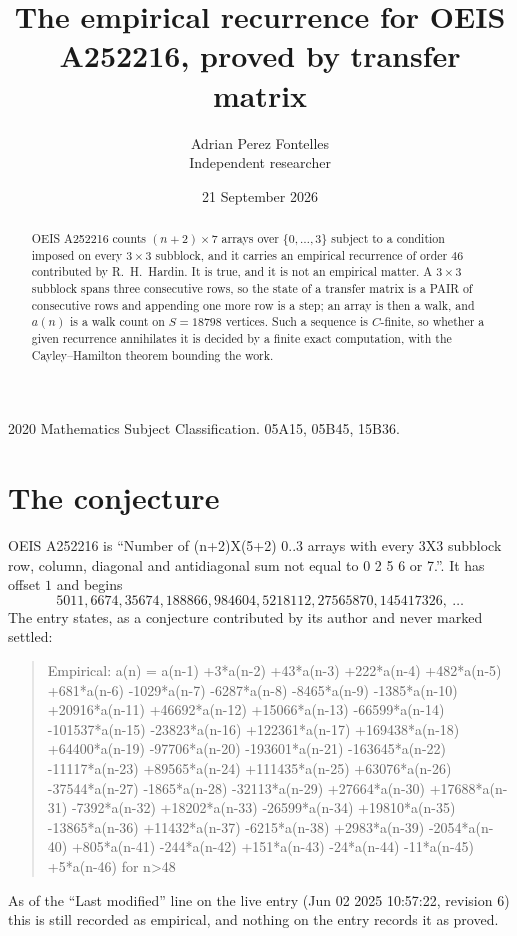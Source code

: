 \documentclass[11pt,a4paper]{article}
\title{The empirical recurrence for OEIS A252216, proved by transfer matrix}
\author{Adrian Perez Fontelles\\ \small Independent researcher}
\date{21 September 2026}
\theoremstyle{plain}
\theoremstyle{definition}
\begin{document}
\maketitle

\begin{abstract}
OEIS A252216 counts $(n+2)\times7$ arrays over $\{0,\dots,3\}$ subject to a condition imposed on
every $3\times3$ subblock, and it carries an empirical recurrence of order $46$
contributed by R.~H.~Hardin. It is true, and it is not an empirical matter. A $3\times3$
subblock spans three consecutive rows, so the state of a transfer matrix is a PAIR of
consecutive rows and appending one more row is a step; an array is then a walk, and
$a(n)$ is a walk count on $S=18798$ vertices. Such a sequence is $C$-finite, so whether a given
recurrence annihilates it is decided by a finite exact computation, with the Cayley--Hamilton
theorem bounding the work.
\end{abstract}

\noindent\small 2020 Mathematics Subject Classification. 05A15, 05B45, 15B36.\normalsize

\section{The conjecture}

OEIS A252216 is ``Number of (n+2)X(5+2) 0..3 arrays with every 3X3 subblock row, column, diagonal and antidiagonal sum not equal to 0 2 5 6 or 7.''. It has offset $1$ and begins
\[
5011, 6674, 35674, 188866, 984604, 5218112, 27565870, 145417326,\ \dots
\]
The entry states, as a conjecture contributed by its author and never marked settled:
\begin{quote}
Empirical: a(n) = a(n-1) +3*a(n-2) +43*a(n-3) +222*a(n-4) +482*a(n-5) +681*a(n-6) -1029*a(n-7) -6287*a(n-8) -8465*a(n-9) -1385*a(n-10) +20916*a(n-11) +46692*a(n-12) +15066*a(n-13) -66599*a(n-14) -101537*a(n-15) -23823*a(n-16) +122361*a(n-17) +169438*a(n-18) +64400*a(n-19) -97706*a(n-20) -193601*a(n-21) -163645*a(n-22) -11117*a(n-23) +89565*a(n-24) +111435*a(n-25) +63076*a(n-26) -37544*a(n-27) -1865*a(n-28) -32113*a(n-29) +27664*a(n-30) +17688*a(n-31) -7392*a(n-32) +18202*a(n-33) -26599*a(n-34) +19810*a(n-35) -13865*a(n-36) +11432*a(n-37) -6215*a(n-38) +2983*a(n-39) -2054*a(n-40) +805*a(n-41) -244*a(n-42) +151*a(n-43) -24*a(n-44) -11*a(n-45) +5*a(n-46) for n>48
\end{quote}
As of the ``Last modified'' line on the live entry (Jun 02 2025 10:57:22, revision 6) this is still
recorded as empirical, and nothing on the entry records it as proved.
\end{document}
